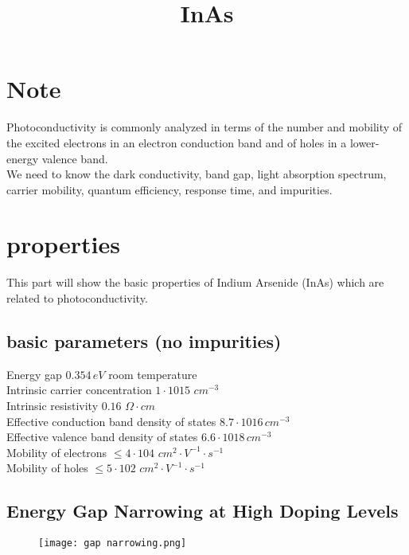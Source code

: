 \documentclass{article}
\title{InAs}
\begin{document}
\maketitle

\section{Note}

    Photoconductivity is commonly analyzed in terms of the number and mobility of the excited electrons in an electron conduction band and of holes in a lower-energy valence band.\\
    We need to know the dark conductivity, band gap, light absorption spectrum, carrier mobility, quantum efficiency, response time, and impurities.


\section{properties}

    This part will show the basic properties of Indium Arsenide (InAs) which are related to photoconductivity.
    
    \subsection{basic parameters (no impurities)}
    
    Energy gap $0.354\,eV$ room temperature\\
    Intrinsic carrier concentration 	$1·1015\,\,cm^{-3}$\\
    Intrinsic resistivity 	$0.16\,\, \Omega\cdot cm$\\
    Effective conduction band density of states 	$8.7·1016\,cm^{-3}$\\
    Effective valence band density of states 	$6.6·1018\,cm^{-3}$\\
    Mobility of electrons 	$\leq4·104\,\, cm^2\cdot V^{-1}\cdot s^{-1}$\\
    Mobility of holes 	$\leq5·102\,\, cm^2\cdot V^{-1}\cdot s^{-1}$

    \subsection{Energy Gap Narrowing at High Doping Levels}
    
        \begin{figure}[H]
            \centering
            \texttt{[image: gap narrowing.png]}
        \end{figure}
\end{document}
